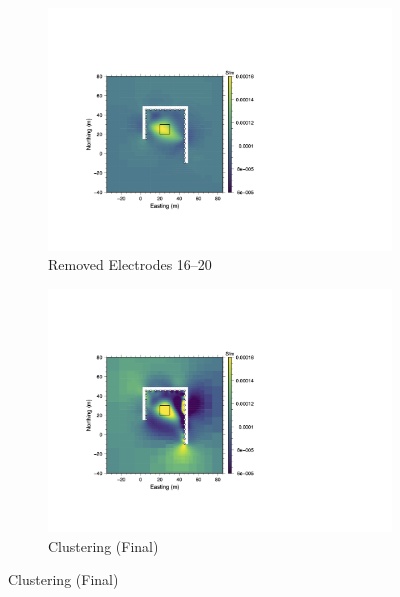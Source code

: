 \documentclass[final,authoryear,5p,times,twocolumn]{elsarticle}
\begin{document}
\begin{figure}[!ht]
   \vspace{1em}

   \begin{subfigure}[b]{0.475\linewidth}
       \centering
       \includegraphics[trim=3.35cm 3.6cm 11.95cm 5.4cm, clip=true, width=\linewidth]{./Figures/Fig25c.png}
       \caption{Removed Electrodes 16--20}
       \label{fig:Synth_Horseshoe_UniInfrastructure_InvMod_NoElec16to20}
   \end{subfigure}
   \hfill
   \begin{subfigure}[b]{0.475\linewidth}
       \centering
       \includegraphics[trim=3.35cm 3.6cm 11.95cm 5.4cm, clip=true, width=\linewidth]{./Figures/Fig25d.png}
       \caption{Clustering (Final)}
       \label{fig:Synth_Horseshoe_UniInfrastructure_InvMod_Clustering}
   \end{subfigure}


\end{figure}
\end{document}
